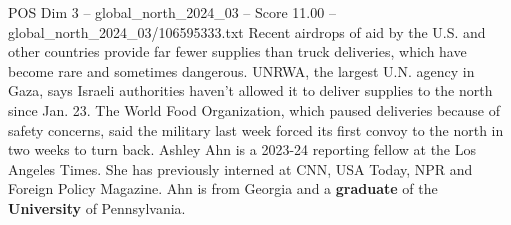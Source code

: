 \begin{textsample}{POS Dim 3 – global\_north\_2024\_03 – Score 11.00 – global\_north\_2024\_03/106595333.txt}
Recent airdrops of aid by the U.S. and other countries provide far fewer supplies than truck deliveries, which have become rare and sometimes dangerous.
UNRWA, the largest U.N. agency in Gaza, says Israeli authorities haven't allowed it to deliver supplies to the north since Jan. 23.
The World Food Organization, which paused deliveries because of safety concerns, said the military last week forced its first convoy to the north in two weeks to turn back.
Ashley Ahn is a 2023-24 reporting fellow at the Los Angeles Times.
She has previously interned at CNN, USA Today, NPR and Foreign Policy Magazine.
Ahn is from Georgia and a \textbf{graduate} of the \textbf{University} of Pennsylvania.

\end{textsample}
